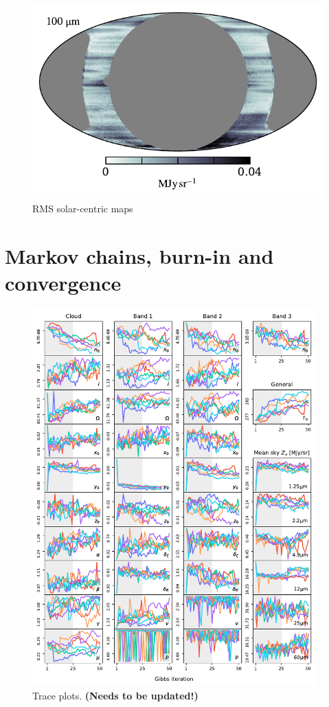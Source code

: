 \documentclass{aa}
\begin{document}
\begin{figure}
  \includegraphics[width=0.80\linewidth]{figs/rms_solar_08.pdf}
  \caption{RMS solar-centric maps}
  \label{fig:solarmaps_rms}
\end{figure}

\clearpage
\section{Markov chains, burn-in and convergence}
\label{sec:chains}

\begin{figure}
    \centering
    \includegraphics[width=0.975\textwidth]{figs/total_trace.pdf}
    \caption{Trace plots. {\bf (Needs to be updated!)}}
    \label{fig:trace}
\end{figure}
\end{document}
